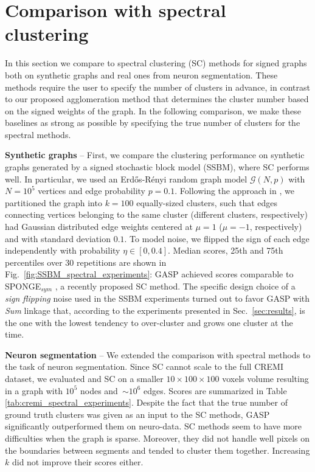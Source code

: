 \section{Comparison with spectral clustering} \label{sec:spectral_clust}
In this section we compare \algname{} to spectral clustering (SC) methods for signed graphs both on synthetic graphs and real ones from neuron segmentation. These methods require the user to specify the number of clusters in advance, in contrast to our proposed agglomeration method that determines the cluster number based on the signed weights of the graph. In the following comparison, we make these baselines as strong as possible by specifying the true number of clusters for the spectral methods.

\textbf{Synthetic graphs} -- First, we compare the clustering performance on synthetic graphs generated by a signed stochastic block model (SSBM), where SC performs well. In particular, we used an Erd\H os-R\'enyi random graph model $\mathcal{G}(N,p)$ with $N=10^5$ vertices and edge probability $p=0.1$. Following the approach in \cite{Cucuringu2019SPONGEAG}, we partitioned the graph into $k=100$ equally-sized clusters, such that edges connecting vertices belonging to the same cluster (different clusters, respectively) had Gaussian distributed edge weights centered at $\mu=1$ ($\mu=-1$, respectively) and with standard deviation $0.1$. To model noise, we flipped the sign of each edge independently with probability $\eta \in [0, 0.4]$. Median scores, 25th and 75th percentiles over 30 repetitions are shown in Fig.~\ref{fig:SSBM_spectral_experiments}: GASP achieved scores comparable to SPONGE$_{sym}$ \cite{Cucuringu2019SPONGEAG}, a recently proposed SC method. The specific design choice of a \emph{sign flipping} noise used in the SSBM experiments turned out to favor GASP with \emph{Sum} linkage that, according to the experiments presented in Sec.~\ref{sec:results}, is the one with the lowest tendency to over-cluster and grows one cluster at the time.

\textbf{Neuron segmentation} -- We extended the comparison with spectral methods to the task of neuron segmentation. Since SC cannot scale to the full CREMI dataset, we evaluated \algname{} and SC on a smaller $10\times100\times100$ voxels volume resulting in a graph with $10^5$ nodes and~$\sim10^6$ edges. Scores are summarized in Table \ref{tab:cremi_spectral_experiments}.
Despite the fact that the true number of ground truth clusters was given as an input to the SC methods, GASP significantly outperformed them on neuro-data. SC methods seem to have more difficulties when the graph is sparse. Moreover, they did not handle well pixels on the boundaries between segments and tended to cluster them together. Increasing $k$ did not improve their scores either.



